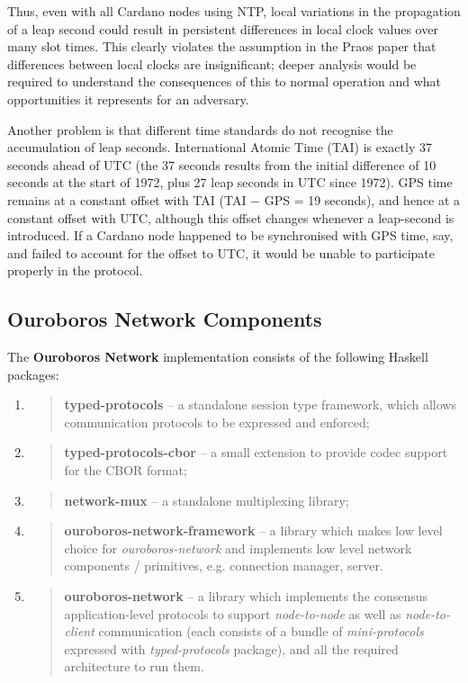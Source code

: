 \documentclass[11pt,a4paper]{article}
\begin{document}
Thus, even with all Cardano nodes using NTP, local variations in the
propagation of a leap second could result in persistent differences in
local clock values over many slot times. This clearly violates the
assumption in the Praos paper that differences between local clocks are
insignificant; deeper analysis would be required to understand the
consequences of this to normal operation and what opportunities it
represents for an adversary.

Another problem is that different time standards do not recognise the
accumulation of leap seconds. International Atomic Time (TAI) is exactly
37 seconds ahead of UTC (the 37 seconds results from the initial
difference of 10 seconds at the start of 1972, plus 27 leap seconds in
UTC since 1972). GPS time remains at a constant offset with TAI (TAI −
GPS = 19 seconds), and hence at a constant offset with UTC, although
this offset changes whenever a leap-second is introduced. If a Cardano
node happened to be synchronised with GPS time, say, and failed to
account for the offset to UTC, it would be unable to participate
properly in the protocol.

\subsection{Ouroboros Network Components}
\label{ouroboros-network-components}

The \textbf{Ouroboros Network} implementation consists of the following
Haskell packages:

\begin{enumerate}
\def\labelenumi{\arabic{enumi}.}
\item
  \begin{quote}
  \textbf{typed-protocols} -- a standalone session type framework, which
  allows communication protocols to be expressed and enforced;
  \end{quote}
\item
  \begin{quote}
  \textbf{typed-protocols-cbor} -- a small extension to provide codec
  support for the CBOR format;
  \end{quote}
\item
  \begin{quote}
  \textbf{network-mux} -- a standalone multiplexing library;
  \end{quote}
\item
  \begin{quote}
  \textbf{ouroboros-network-framework} -- a library which makes low
  level choice for \emph{ouroboros-network} and implements low level
  network components / primitives, e.g. connection manager, server.
  \end{quote}
\item
  \begin{quote}
  \textbf{ouroboros-network} -- a library which implements the consensus
  application-level protocols to support \emph{node-to-node} as well as
  \emph{node-to-client} communication (each consists of a bundle of
  \emph{mini-protocols} expressed with \emph{typed-protocols} package),
  and all the required architecture to run them.
  \end{quote}
\end{enumerate}
\end{document}
